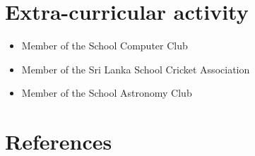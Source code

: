 \documentclass[11pt,a4paper,scan]{moderncv}        %
\begin{document}
\section{Extra-curricular activity}

\vspace{2pt}

\begin{itemize}

\item Member of the School Computer Club

\vspace{2pt}

\item Member of the Sri Lanka School Cricket Association
\vspace{2pt}

\item Member of the School Astronomy Club
\end{itemize}



\section{References}

 
\end{document}
